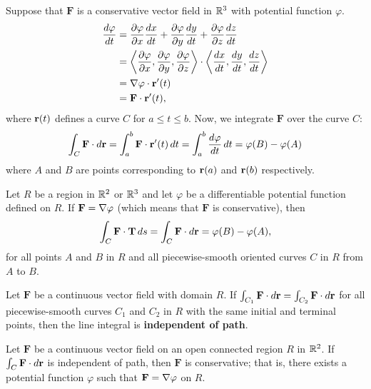 \documentclass[../mathNotesPreamble]{subfiles}
\begin{document}
  \noindent Suppose that $\mathbf F$ is a conservative vector field in $\mathbb{R}^3$ with potential function $\varphi$. 
  \begin{align*}
    \frac{d\varphi}{dt}&= \frac{\partial\varphi}{\partial x}\frac{dx}{dt}+\frac{\partial\varphi}{\partial y}\frac{dy}{dt}+\frac{\partial\varphi}{\partial z}\frac{dz}{dt}\\
      &={\left\langle \frac{\partial \varphi}{\partial x},\frac{\partial \varphi}{\partial y},\frac{\partial \varphi}{\partial z} \right\rangle}\cdot{\left\langle \frac{dx}{dt},\frac{dy}{dt},\frac{dz}{dt} \right\rangle}\\
      &=\nabla\varphi\cdot{\mathbf{r}}'(t)\\
      &=\mathbf F\cdot{\mathbf{r}}'(t),
  \end{align*}
  where ${\mathbf{r}}(t)$ defines a curve $C$ for $a\leq t\leq b$. Now, we integrate $\mathbf F$ over the curve $C$:
  \begin{align*}
    \int_C\mathbf F\cdot d{\mathbf{r}}= \int_a^b \mathbf F\cdot{\mathbf{r}}'(t)\,dt
      =\int_a^b \frac{d\varphi}{dt}\,dt
      =\varphi(B)-\varphi(A)
  \end{align*}
  where $A$ and $B$ are points corresponding to ${\mathbf{r}}(a)$ and ${\mathbf{r}}(b)$ respectively.


  \begin{thmBox*}
    Let $R$ be a region in $\mathbb{R}^2$ or $\mathbb{R}^3$ and let $\varphi$ be a differentiable potential function defined on $R$. If $\mathbf F=\nabla\varphi$ (which means that $\mathbf F$ is conservative), then
       \[\int_C \mathbf F\cdot{\mathbf{T}}\,ds=\int_C \mathbf F\cdot d{\mathbf{r}}=\varphi(B)-\varphi(A),\]
     for all points $A$ and $B$ in $R$ and all piecewise-smooth oriented curves $C$ in $R$ from $A$ to $B$.
  \end{thmBox*}

  \begin{defn*}
    Let $\mathbf F$ be a continuous vector field with domain $R$. If $\int_{C_1} \mathbf F\cdot d{\mathbf{r}}=\int_{C_2} \mathbf F\cdot d{\mathbf{r}}$ for all piecewise-smooth curves $C_1$ and $C_2$ in $R$ with the same initial and terminal points, then the line integral is \textbf{independent of path}.
  \end{defn*}
  \pagebreak

  \begin{thmBox*}[Theorem 17.5]
    Let $\mathbf F$ be a continuous vector field on an open connected region $R$ in $\mathbb{R}^2$. If $\int_C \mathbf F\cdot d{\mathbf{r}}$ is independent of path, then $\mathbf F$ is conservative; that is, there exists a potential function $\varphi$ such that $\mathbf F=\nabla \varphi$ on $R$. 
  \end{thmBox*}
\end{document}
